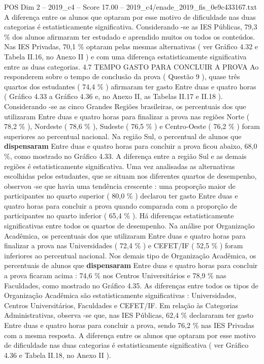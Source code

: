 \begin{textsample}{POS Dim 2 – 2019\_c4 – Score 17.00 – 2019\_c4/enade\_2019\_fis\_0e9c433167.txt}
A diferença entre os alunos que optaram por esse motivo de dificuldade nas duas categorias é estatisticamente significativa.
Considerando -se as IES Públicas, 79,3 \% dos alunos afirmaram ter estudado e aprendido muitos ou todos os conteúdos.
Nas IES Privadas, 70,1 \% optaram pelas mesmas alternativas ( ver Gráfico 4.32 e Tabela II.16, no Anexo II ) e com uma diferença estatisticamente significativa entre as duas categorias. 4.7 TEMPO GASTO PARA CONCLUIR A PROVA Ao responderem sobre o tempo de conclusão da prova ( Questão 9 ), quase três quartos dos estudantes ( 74,4 \% ) afirmaram ter gasto Entre duas e quatro horas ( Gráfico 4.33 a Gráfico 4.36 e, no Anexo II, as Tabelas II.17 e II.18 ).
Considerando -se as cinco Grandes Regiões brasileiras, os percentuais dos que utilizaram Entre duas e quatro horas para finalizar a prova nas regiões Norte ( 78,2 \% ), Nordeste ( 78,6 \% ), Sudeste ( 76,5 \% ) e Centro-Oeste ( 76,2 \% ) foram superiores ao percentual nacional.
Na região Sul, o percentual de alunos que \textbf{dispensaram} Entre duas e quatro horas para concluir a prova ficou abaixo, 68,0 \%, como mostrado no Gráfico 4.33.
A diferença entre a região Sul e as demais regiões é estatisticamente significativa.
Uma vez analisadas as alternativas escolhidas pelos estudantes, que se situam nos diferentes quartos de desempenho, observou -se que havia uma tendência crescente : uma proporção maior de participantes no quarto superior ( 80,0 \% ) declarou ter gasto Entre duas e quatro horas para concluir a prova quando comparada com a proporção de participantes no quarto inferior ( 65,4 \% ).
Há diferenças estatisticamente significativas entre todos os quartos de desempenho.
Na análise por Organização Acadêmica, os percentuais dos que utilizaram Entre duas e quatro horas para finalizar a prova nas Universidades ( 72,4 \% ) e CEFET/IF ( 52,5 \% ) foram inferiores ao percentual nacional.
Nos demais tipo de Organização Acadêmica, os percentuais de alunos que \textbf{dispensaram} Entre duas e quatro horas para concluir a prova ficaram acima : 74,6 \% nos Centros Universitários e 78,9 \% nas Faculdades, como mostrado no Gráfico 4.35.
As diferenças entre todos os tipos de Organização Acadêmica são estatisticamente significativas : Universidades, Centros Universitários, Faculdades e CEFET/IF.
Em relação às Categorias Administrativas, observa -se que, nas IES Públicas, 62,4 \% declararam ter gasto Entre duas e quatro horas para concluir a prova, sendo 76,2 \% nas IES Privadas com a mesma resposta.
A diferença entre os alunos que optaram por esse motivo de dificuldade nas duas categorias é estatisticamente significativa ( ver Gráfico 4.36 e Tabela II.18, no Anexo II ).

\end{textsample}
